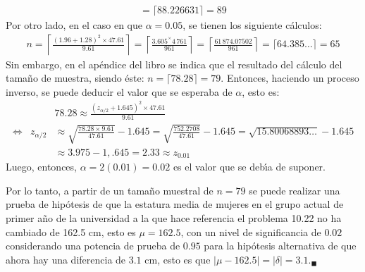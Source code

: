 \begin{solucion}
\begin{eqnarray*}
  = \lceil 88.226631 \rceil = 89
 \end{eqnarray*}
 Por otro lado, en el caso en que $\alpha = 0.05$, se tienen los siguiente c\'alculos:
 \begin{eqnarray*}
  n =
  \left\lceil \frac{(1.96 + 1.28)^2 \times 47.61}{9.61} \right\rceil
  = \left\lceil \frac{3.605^\times 4\,761}{961} \right\rceil
  = \left\lceil \frac{61\,874.07502}{961} \right\rceil
  = \lceil 64.385\ldots \rceil = 65
 \end{eqnarray*}
 Sin embargo, en el ap\'endice del libro se indica que el resultado
 del c\'alculo del tama\~no de muestra, siendo \'este:
 $n = \lceil 78.28 \rceil = 79$. 
 Entonces, haciendo un proceso inverso, se puede deducir el valor que se esperaba de $\alpha$, esto es:
 \begin{eqnarray*}
  & & 78.28 \approx \frac{\left( z_{\alpha/2} + 1.645 \right)^2 \times 47.61}{9.61} \\
  \Leftrightarrow & z_{\alpha/2} &
  \approx \sqrt{ \frac{78.28 \times 9.61}{47.61} } - 1.645 
  = \sqrt{\frac{752.2708}{47.61}} - 1.645
  = \sqrt{15.80068893\ldots} - 1.645 \\
  & & \approx 3.975 - 1,.645 = 2.33 \approx z_{0.01}
 \end{eqnarray*}
 Luego, entonces, $\alpha = 2(0.01) = 0.02$ es el valor que se deb\'{\i}a de suponer.
 \par 
 Por lo tanto, a partir de un tama\~no muestral de $n = 79$
 se puede realizar una prueba de hip\'otesis
 de que la estatura media de mujeres en el grupo actual de primer a\~no
 de la universidad a la que hace referencia el problema 10.22
 no ha cambiado de 162.5 cm, esto es $\mu = 162.5$,
 con un nivel de significancia de $0.02$
 considerando una potencia de prueba de $0.95$
 para la hip\'otesis alternativa de que ahora hay una diferencia de $3.1$ cm,
 esto es que $\left| \mu - 162.5 \right| = |\delta| = 3.1$.${}_{\blacksquare}$
\end{solucion}
